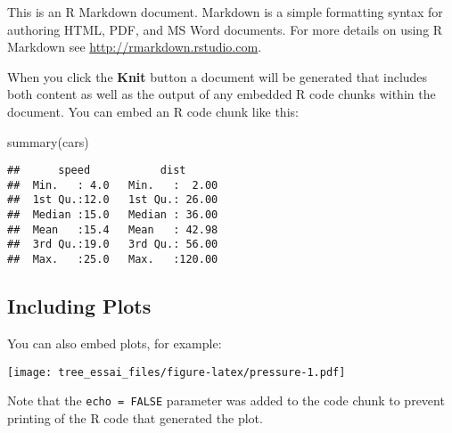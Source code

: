 \documentclass[
]{article}
\newenvironment{Shaded}{\begin{snugshade}}{\end{snugshade}}
\newcommand{\FunctionTok}[1]{\textcolor[rgb]{0.00,0.00,0.00}{#1}}
\newcommand{\NormalTok}[1]{#1}
\begin{document}
This is an R Markdown document. Markdown is a simple formatting syntax
for authoring HTML, PDF, and MS Word documents. For more details on
using R Markdown see \url{http://rmarkdown.rstudio.com}.

When you click the \textbf{Knit} button a document will be generated
that includes both content as well as the output of any embedded R code
chunks within the document. You can embed an R code chunk like this:

\begin{Shaded}
\begin{Highlighting}[]
\FunctionTok{summary}\NormalTok{(cars)}
\end{Highlighting}
\end{Shaded}

\begin{verbatim}
##      speed           dist       
##  Min.   : 4.0   Min.   :  2.00  
##  1st Qu.:12.0   1st Qu.: 26.00  
##  Median :15.0   Median : 36.00  
##  Mean   :15.4   Mean   : 42.98  
##  3rd Qu.:19.0   3rd Qu.: 56.00  
##  Max.   :25.0   Max.   :120.00
\end{verbatim}

\hypertarget{including-plots}{%
\subsection{Including Plots}\label{including-plots}}

You can also embed plots, for example:

\texttt{[image: tree\_essai\_files/figure-latex/pressure-1.pdf]}

Note that the \texttt{echo\ =\ FALSE} parameter was added to the code
chunk to prevent printing of the R code that generated the plot.
\end{document}
